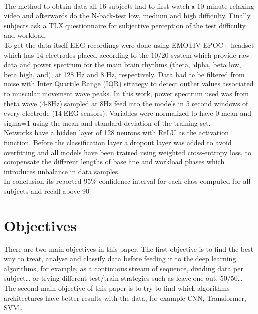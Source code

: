 ﻿\documentclass[10pt,a4paper,twocolumn,twoside]{article}
\begin{document}
\\
The method to obtain data all 16 subjects had to first watch a 10-minute relaxing video and afterwards do the N-back-test low, medium and high difficulty. Finally subjects ask a TLX questionnaire for subjective perception of the test difficulty and workload.
\\
To get the data itself EEG recordings were done using EMOTIV EPOC+ headset which has 14 electrodes placed according to the 10/20 system which provide raw data and power spectrum for the main brain rhythms (theta, alpha, beta low, beta high, and), at 128 Hz and 8 Hz, respectively. Data had to be filtered from noise with Inter Quartile Range (IQR) strategy to detect outlier values associated to muscular movement wave peaks. In this work, power spectrum used was from theta wave (4-8Hz) sampled at 8Hz feed into the models in 5 second windows of every electrode (14 EEG sensors). Variables were normalized to have 0 mean and
sigma=1 using the mean and standard deviation of the training set. 
\\
Networks have a hidden layer of 128 neurons with ReLU as the activation function. Before the classification layer a dropout layer was added to avoid overfitting and all models have been trained using weighted cross-entropy loss, to compensate the different lengths of base line and workload phases which introduces unbalance in data samples.
\\
In conclusion its reported 95\% confidence interval for each class computed for all subjects and recall above 90%



\section{Objectives}
\label{sec-objectives}
There are two main objectives in this paper. The first objective is to find the best way to treat, analyse and classify data before feeding it to the deep learning algorithms, for example, as a continuous stream of sequence, dividing data per subject…  or trying different test/train strategies such as leave one out, 50/50… The second main objective of this paper is to try to find which algorithms architectures have better results with the data, for example CNN, Transformer, SVM…
\\
\end{document}
